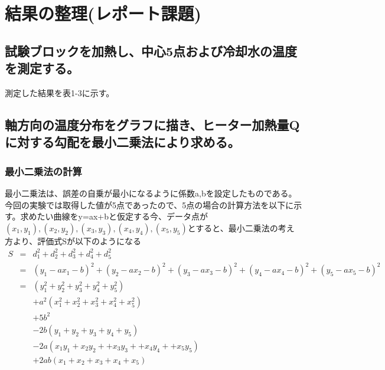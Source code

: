\documentclass[a4j,twoside,openright,11pt]{jarticle}
\begin{document}
\section{結果の整理(レポート課題)}
\subsection{試験ブロックを加熱し、中心5点および冷却水の温度を測定する。}
測定した結果を表1-3に示す。
\newpage
\subsection{軸方向の温度分布をグラフに描き、ヒーター加熱量Qに対する勾配を最小二乗法により求める。}
\subsubsection{最小二乗法の計算}
最小二乗法は、誤差の自乗が最小になるように係数a,bを設定したものである。今回の実験では取得した値が5点であったので、5点の場合の計算方法を以下に示す。求めたい曲線をy=ax+bと仮定する今、データ点が$(x_1,y_1),(x_2,y_2),(x_3,y_3),(x_4,y_4),(x_5,y_5)$とすると、最小二乗法の考え方より、評価式Sが以下のようになる
\begin{eqnarray}
S &=& d_1^2 + d_2^2 + d_3^2 + d_4^2 + d_5^2 \nonumber\\
&=& (y_1-ax_1-b)^2 + (y_2-ax_2-b)^2 + (y_3-ax_3-b)^2 + (y_4-ax_4-b)^2 + (y_5-ax_5-b)^2\nonumber \\
&=&(y_1^2 + y_2^2 + y_3^2 + y_4^2 + y_5^2)\nonumber\\
&& +a^2(x_1^2 + x_2^2 + x_3^2 + x_4^2 + x_5^2)\nonumber\\
&& +5b^2\nonumber\\
&&- 2b(y_1 + y_2 + y_3 + y_4 + y_5)\nonumber\\
&& -2a(x_1y_1 + x_2y_2 + + x_3y_3 + + x_4y_4 + + x_5y_5) \nonumber\\
&&+ 2ab(x_1 + x_2 + x_3 + x_4 + x_5)
\end{eqnarray}
\end{document}
